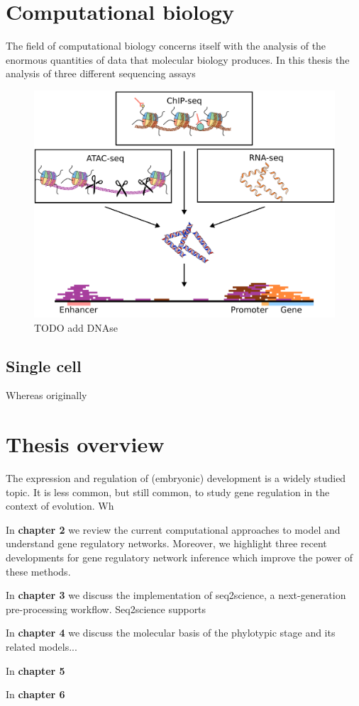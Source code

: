\section{Computational biology}

The field of computational biology concerns itself with the analysis of the enormous quantities of data that molecular biology produces. In this thesis the analysis of three different sequencing assays 

\begin{figure}[H]
    \includegraphics[width=\linewidth]{ch1.Introduction/imgs/analysis.png}
    \caption{TODO add DNAse}
    \label{fig:analysis}
\end{figure}

\subsection{Single cell}

Whereas originally 

\section{Thesis overview}

The expression and regulation of (embryonic) development is a widely studied topic. It is less common, but still common, to study gene regulation in the context of evolution. Wh

In \textbf{chapter 2} we review the current computational approaches to model and understand gene regulatory networks. Moreover, we highlight three recent developments for gene regulatory network inference which improve the power of these methods.

In \textbf{chapter 3} we discuss the implementation of seq2science, a next-generation pre-processing workflow. Seq2science supports

In \textbf{chapter 4} we discuss the molecular basis of the phylotypic stage and its related models...

In \textbf{chapter 5} 

In \textbf{chapter 6} 
